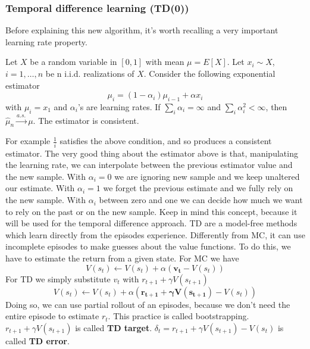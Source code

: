 \documentclass[../main.tex]{subfiles}
\begin{document}
\subsubsection{Temporal difference learning (TD(0))}
Before explaining this new algorithm, it's worth recalling a very important learning rate property.
\begin{proposition}
    Let $X$ be a random variable in $[0, 1]$ with mean $\mu = E[X]$. Let $x_i \sim X$, $i=1,\dots,n$ be n i.i.d. realizations of $X$.
    Consider the following exponential estimator
    \begin{equation*}
        \mu_i = (1-\alpha_i) \mu_{i-1} + \alpha x_i
    \end{equation*}
    with $\mu_i=x_1$ and $\alpha_i$'s are learning rates.
    \newline
    If $\sum_i \alpha_i = \infty$ and $\sum_i \alpha_i^2 < \infty$, then $\hat{\mu}_n \overset{a.s.}{\rightarrow} \mu$. The estimator is consistent.
\end{proposition}
For example $\frac{1}{i}$ satisfies the above condition, and so produces a consistent estimator.
The very good thing about the estimator above is that, manipulating the learning rate, we can interpolate between the previous estimator value and the new sample. With $\alpha_i=0$ we are ignoring new sample and we keep unaltered our estimate. With $\alpha_i = 1$ we forget the previous estimate and we fully rely on the new sample. With $\alpha_i$ between zero and one we can decide how much we want to rely on the past or on the new sample. Keep in mind this concept, because it will be used for the temporal difference approach.
TD are a model-free methods which learn directly from the episodes experience. Differently from MC, it can use incomplete episodes to make guesses about the value functions. To do this, we have to estimate the return from a given state. For MC we have
\begin{equation*}
    V(s_t) \leftarrow V(s_t) + \alpha(\mathbf{v_t}-V(s_t))
\end{equation*}
For TD we simply substitute $v_t$ with $r_{t+1} + \gamma V(s_{t+1})$
\begin{equation*}
    V(s_t) \leftarrow V(s_t) + \alpha(\mathbf{r_{t+1} + \gamma V(s_{t+1})}-V(s_t))
\end{equation*}
Doing so, we can use partial rollout of an episodes, because we don't need the entire episode to estimate $r_t$. This practice is called bootstrapping. $r_{t+1} + \gamma V(s_{t+1})$ is called \textbf{TD target}. $\delta_t = r_{t+1} + \gamma V(s_{t+1}) - V(s_t)$ is called \textbf{TD error}.
\end{document}

